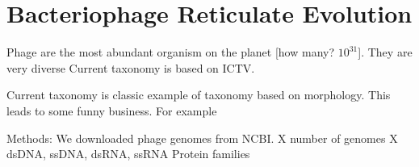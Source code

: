 \chapter{Bacteriophage Reticulate Evolution}
\label{ch:phage}

Phage are the most abundant organism on the planet [how many? $10^31$].
They are very diverse
Current taxonomy is based on ICTV.

Current taxonomy is classic example of taxonomy based on morphology.
This leads to some funny business.
For example

Methods:
We downloaded phage genomes from NCBI.
X number of genomes
X dsDNA, ssDNA, dsRNA, ssRNA
Protein families